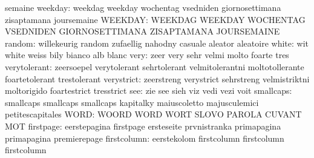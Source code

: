                            semaine
                  weekday: weekdag                   weekday
                           wochentag                 vsedniden
                           giornosettimana           zisaptamana
                           joursemaine
                  WEEKDAY: WEEKDAG                   WEEKDAY
                           WOCHENTAG                 VSEDNIDEN
                           GIORNOSETTIMANA           ZISAPTAMANA
                           JOURSEMAINE
                   random: willekeurig               random
                           zufaellig                 nahodny
                           casuale                   aleator
                           aleatoire
                    white: wit                       white
                           weiss                     bily
                           bianco                    alb
                           blanc
                     very: zeer                      very
                           sehr                      velmi
                           molto                     foarte
                           tres
             verytolerant: zeersoepel                verytolerant
                           sehrtolerant              velmitolerantni
                           moltotollerante           foartetolerant
                           trestolerant
               verystrict: zeerstreng                verystrict
                           sehrstreng                velmistriktni
                           moltorigido               foartestrict
                           tresstrict
                      see: zie                       see
                           sieh                      viz
                           vedi                      vezi
                           voit
                smallcaps: smallcaps                 smallcaps
                           smallcaps                 kapitalky
                           maiuscoletto              majusculemici
                           petitescapitales
                     WORD: WOORD                     WORD
                           WORT                      SLOVO
                           PAROLA                    CUVANT
                           MOT
                firstpage: eerstepagina              firstpage
                           ersteseite                prvnistranka
                           primapagina               primapagina
                           premierepage
              firstcolumn: eerstekolom               firstcolumn
                           firstcolumn               firstcolumn
